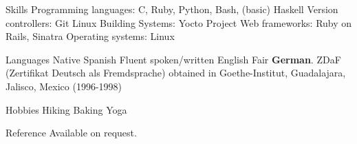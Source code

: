 \documentclass{resume}
\begin{document}
\begin{category}{Skills}
\citembullet Programming languages: C, Ruby, Python, Bash, (basic) Haskell
\citembullet Version controllers: Git
\citembullet Linux Building Systems: Yocto Project
\citembullet Web frameworks: Ruby on Rails, Sinatra
\citembullet Operating systems: Linux
\end{category}

\begin{category}{Languages}
\citembullet Native Spanish
\citembullet Fluent spoken/written English
\citembullet Fair \textbf{German}. ZDaF (Zertifikat Deutsch als Fremdsprache) obtained in Goethe-Institut, Guadalajara, Jalisco, Mexico (1996-1998)
\end{category}

\begin{category}{Hobbies}
\citembullet Hiking
\citembullet Baking
\citembullet Yoga
\end{category}

\begin{category}{Reference} 
\citemnobullet Available on request.
\end{category}
\end{document}
